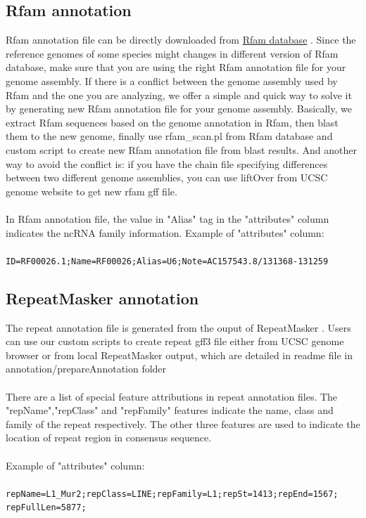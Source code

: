 \documentclass[12pt]{article}
\begin{document}
\subsection{Rfam annotation}
\label{subsection:rfam}
Rfam annotation file can be directly downloaded from \href{ftp://ftp.sanger.ac.uk/pub/databases/Rfam}{ Rfam database} \cite{Gardner2011}. Since the reference genomes of some species might changes in different version of Rfam database, make sure that you are using the right Rfam annotation file for your genome assembly. If there is a conflict between the genome assembly used by Rfam and the one you are analyzing, we offer a simple and quick way to solve it by generating new Rfam annotation file for your genome assembly. Basically, we extract Rfam sequences based on the genome annotation in Rfam, then blast them to the new genome, finally use rfam\_scan.pl from Rfam database and custom script to create new Rfam annotation file from blast results. And another way to avoid the conflict is: if you have the chain file specifying differences between two different genome assemblies, you can use liftOver from UCSC genome website to get new rfam gff file. \\\\
In Rfam annotation file, the value in "Alias" tag in the "attributes" column indicates the ncRNA family information. Example of "attributes" column:\\\\
\verb|ID=RF00026.1;Name=RF00026;Alias=U6;Note=AC157543.8/131368-131259|

\subsection{RepeatMasker annotation}
\label{subsection:repeat}
The repeat annotation file is generated from the ouput of RepeatMasker \cite{Smit2008}. Users can use our custom scripts to create repeat gff3 file either from UCSC genome browser or from local RepeatMasker output, which are detailed in readme file in annotation/prepareAnnotation folder\\\\ 
There are a list of special feature attributions in repeat annotation files. The "repName","repClass" and "repFamily" features indicate the name, class and family of the repeat respectively. The other three features are used to indicate the location of repeat region in consensus sequence. \\\\
Example of "attributes" column:\\\\
\verb|repName=L1_Mur2;repClass=LINE;repFamily=L1;repSt=1413;repEnd=1567;| \\
\verb|repFullLen=5877;|
\end{document}
